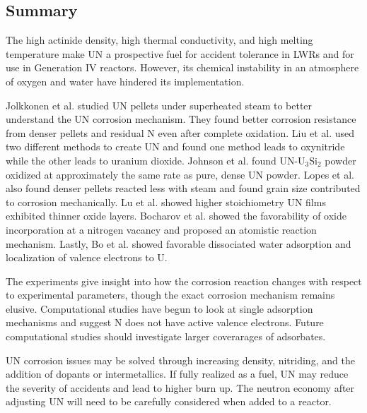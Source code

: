\documentclass[11pt]{article}
\begin{document}
\begin{multicols}{2}

\section{Summary}
The high actinide density, high thermal conductivity, and high melting temperature make UN a prospective fuel for accident tolerance in LWRs and for use in Generation IV reactors. However, its chemical instability in an atmosphere of oxygen and water have hindered its implementation. 
\par Jolkkonen et al. \cite{Jolkkonen2017} studied UN pellets under superheated steam to better understand the UN corrosion mechanism. They found better corrosion resistance from denser pellets and residual N even after complete oxidation. Liu et al. \cite{Liu2013} used two different methods to create UN and found one method leads to oxynitride while the other leads to uranium dioxide. Johnson et al. \cite{Johnson2016} found UN-U$_{3}$Si$_{2}$ powder oxidized at approximately the same rate as pure, dense UN powder. Lopes et al. \cite{Lopes2017} also found denser pellets reacted less with steam and found grain size contributed to corrosion mechanically. Lu et al. showed higher stoichiometry UN films exhibited thinner oxide layers. Bocharov et al. \cite{Bocharov2013} showed the favorability of oxide incorporation at a nitrogen vacancy and proposed an atomistic reaction mechanism. Lastly, Bo et al. \cite{Bo2016} showed favorable dissociated water adsorption and localization of valence electrons to U.
\par The experiments give insight into how the corrosion reaction changes with respect to experimental parameters, though the exact corrosion mechanism remains elusive. Computational studies have begun to look at single adsorption mechanisms and suggest N does not have active valence electrons. Future computational studies should investigate larger coverarages of adsorbates. 
\par 
UN corrosion issues may be solved through increasing density, nitriding, and the addition of dopants or intermetallics. If fully realized as a fuel, UN may reduce the severity of accidents and lead to higher burn up. The neutron economy after adjusting UN will need to be carefully considered when added to a reactor.








\end{multicols}
\end{document}
